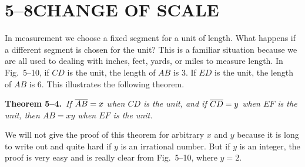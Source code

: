 \documentclass[11pt]{book}
\begin{document}
\section*{5--8\quad CHANGE OF SCALE}

In measurement we choose a fixed segment for a unit of length. What happens if
a different segment is chosen for the unit? This is a familiar situation
because we are all used to dealing with inches, feet, yards, or miles to
measure length. In Fig.~5--10, if $CD$ is the unit, the length of $AB$ is 3. If
$ED$ is the unit, the length of $AB$ is 6. This illustrates the following
theorem.

\FIGVTEN

\medskip\noindent
\textbf{Theorem 5--4.}\ \emph{If $\overline{AB} = x$ when $CD$ is the unit, and if
$\overline{CD} = y$ when $EF$ is the unit, then $AB = xy$ when $EF$ is the unit.}
\par\medskip

We will not give the proof of this theorem for arbitrary $x$ and $y$ because it
is long to write out and quite hard if $y$ is an irrational number. But if $y$
is an integer, the proof is very easy and is really clear from Fig.~5--10,
where $y = 2$.

\end{document}
